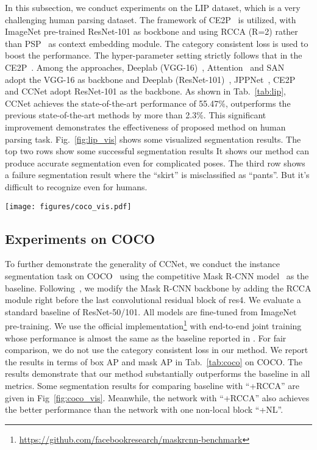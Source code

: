 \documentclass[10pt,journal,compsoc]{IEEEtran}
\begin{document}
In this subsection, we conduct experiments on the LIP dataset, which is a very challenging human parsing dataset. The framework of CE2P~\cite{ruan2019devil}  is utilized, with ImageNet pre-trained ResNet-101 as bockbone and using RCCA (R=2) rather than PSP~\cite{zhao2017pyramid} as context embedding module. The category consistent loss is used to boost the performance.
The hyper-parameter setting strictly follows that in the
CE2P~\cite{ruan2019devil}. Among the approaches, Deeplab (VGG-16)~\cite{chen2014semantic}, Attention~\cite{chen2016attention} and SAN~\cite{huang2019sanet} adopt the VGG-16 as backbone and Deeplab (ResNet-101)~\cite{chen2018deeplab}, JPPNet~\cite{liang2018look}, CE2P~\cite{ruan2019devil} and CCNet adopt ResNet-101 as the backbone.
As shown in Tab.~\ref{tab:lip}, CCNet achieves the state-of-the-art performance of 55.47\%, outperforms the previous state-of-the-art methods by more than 2.3\%. This significant improvement demonstrates the effectiveness of proposed method on human parsing task. Fig.~\ref{fig:lip_vis} shows some visualized segmentation results. 
The top two rows show some successful segmentation results
It shows our method can produce accurate segmentation even for complicated poses. The third row shows a failure segmentation result where the ``skirt'' is misclassified as ``pants''. But it's difficult to recognize even for humans.

    \begin{figure*}[!t]
        \centering
        \texttt{[image: figures/coco\_vis.pdf]}
        \caption{Visualized examples for instance segmentation result on COCO val set.}
        \label{fig:coco_vis}
    \end{figure*}
    
\subsection{Experiments on COCO}

To further demonstrate the generality of CCNet, we conduct the instance segmentation task on COCO~\cite{lin2014microsoft} using the competitive Mask R-CNN model~\cite{he2017mask} as the baseline. Following~\cite{wang2018non}, we modify
the Mask R-CNN backbone by adding the RCCA module right before the last convolutional residual block of res4. We evaluate a standard baseline of ResNet-50/101. All models are fine-tuned from ImageNet pre-training. We use the official implementation\footnote{\url{https://github.com/facebookresearch/maskrcnn-benchmark}} with end-to-end joint training whose performance is almost the same as the baseline reported in \cite{wang2018non}. 
For fair comparison, we do not use the category consistent loss in our method. We report the results in terms of box AP and mask AP in Tab.~\ref{tab:coco} on COCO. The results demonstrate that our method substantially outperforms the baseline in all metrics. Some segmentation results for comparing baseline with ``+RCCA'' are given in Fig~\ref{fig:coco_vis}. Meanwhile, the network with ``+RCCA'' also achieves the better performance than the network with one non-local block ``+NL''.
\end{document}
